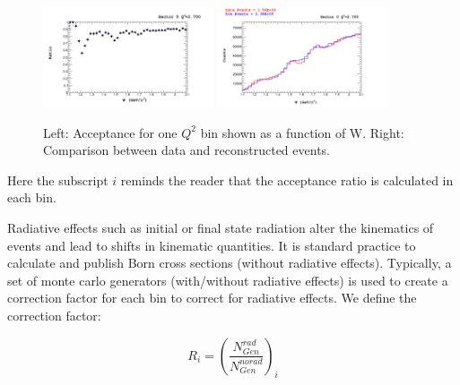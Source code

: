 \begin{figure}
  \centering
  \includegraphics[width=5cm]{image/acceptanceSector0Slice4.png}
  \includegraphics[width=5cm]{image/compareDataSimSector0Slice4.png}
  \caption{Left: Acceptance for one $Q^{2}$ bin shown as a function of W.  Right: Comparison between data and reconstructed events. }
  \label{fig:acceptance}
\end{figure}

Here the subscript $i$ reminds the reader that the acceptance ratio is calculated in each bin.  

Radiative effects such as initial or final state radiation alter the kinematics of events and lead to shifts in kinematic quantities.  It is standard practice to calculate and publish Born cross sections (without radiative effects).  Typically, a set of monte carlo generators (with/without radiative effects) is used to create a correction factor for each bin to correct for radiative effects.  We define the correction factor:

\begin{equation}
  R_{i} = \left( \frac{N_{Gen}^{rad}}{N_{Gen}^{norad}} \right)_{i}
\end{equation}
